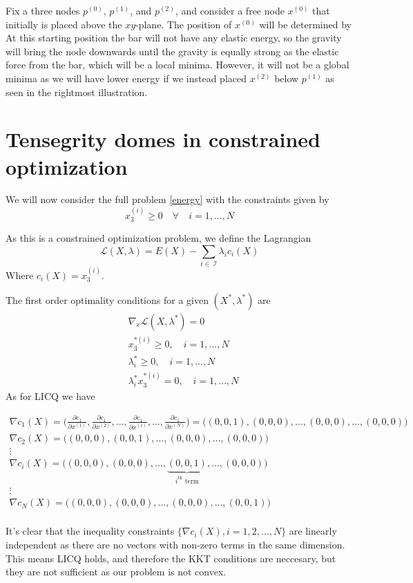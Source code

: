 Fix a three nodes $p^{(0)}$, $p^{(1)}$, and $p^{(2)}$, and consider a free node $x^{(0)}$ that initially is placed above the $xy$-plane. The position of $x^{(0)}$ will be determined by  
At this starting position the bar will not have any elastic energy, so the gravity will bring the node downwards until the gravity is equally strong as the elastic force from the bar, which will be a local minima. However, it will not be a global minima as we will have lower energy if we instead placed $x^{(2)}$ below $p^{(1)}$ as seen in the rightmost illustration. 



\section{Tensegrity domes in constrained optimization}
We will now consider the full problem \eqref{energy} with the constraints given by 
\begin{equation}
    x_3^{(i)} \geq 0 \quad \forall \quad i = 1,...,N
\end{equation}

As this is a constrained optimization problem, we define the Lagrangian \begin{equation}
    \mathcal{L}(X,\lambda) = E(X) - \sum_{i \in \ \mathcal{I}}\lambda_i c_i(X)
\end{equation}
Where $c_i(X) = x^{(i)}_3$.

The first order optimality conditions for a given $(X^*,\lambda^*)$ are \begin{equation}
\begin{aligned}
       &\nabla_x \mathcal{L}(X,\lambda^*)=0\\ 
       &x^{*(i)}_3 \geq 0,\quad i = 1,...,N\\
       &\lambda_i^* \geq 0 ,\quad i = 1,...,N\\
       & \lambda_i^* x^{*(i)}_3 = 0,\quad i = 1,...,N
\end{aligned}
\end{equation}
As for LICQ we have 

\begin{align*}
    \nabla c_1(X) = \bigg( \frac{\partial c_1}{\partial x^{(1)}},\frac{\partial c_1}{\partial x^{(2)}},...,\frac{\partial c_1}{\partial x^{(i)}},...,\frac{\partial c_1}{\partial x^{(N)}} \bigg) =\bigg( (0,0,1),(0,0,0),...,(0,0,0),...,(0,0,0) \bigg) \\
    \nabla c_2(X) = \bigg( (0,0,0),(0,0,1),...,(0,0,0),...,(0,0,0) \bigg) \\
    \vdots 
    \hspace{200pt}\\
    \nabla c_i(X) = \bigg( (0,0,0),(0,0,0),...,\underbrace{(0,0,1)}_{i^{\text{th}}\text{ term}},...,(0,0,0) \bigg)\\
    \vdots
    \hspace{200pt}\\
    \nabla c_N(X) = \bigg( (0,0,0),(0,0,0),...,(0,0,0),...,(0,0,1) \bigg) \\
\end{align*}

It's clear that the inequality constraints $\{\nabla c_i(X),i=1,2,...,N\}$ are linearly independent as there are no vectors with non-zero terms in the same dimension. This means LICQ holds, and therefore the KKT conditions are neccesary, but they are not sufficient as our problem is not convex.